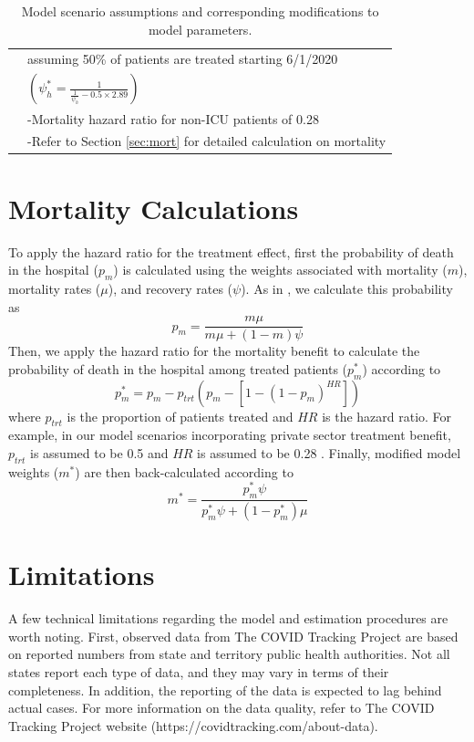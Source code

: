 \documentclass{article}
\begin{document}
\begin{table}
\begin{center}
\begin{tabular}{|c|l|}
 & assuming 50\% of patients are treated starting 6/1/2020 \\
 & $\left(\psi_h^* = \frac{1}{\frac{1}{\psi_h} - 0.5\times2.89}\right)$ \\
 & -Mortality hazard ratio for non-ICU patients of 0.28 \\
 & -Refer to Section \ref{sec:mort} for detailed calculation on mortality \\
\hline
\end{tabular}
\caption{Model scenario assumptions and corresponding modifications to model parameters.}
\label{tab:eff}
\end{center}
\end{table}

\clearpage

\section{Mortality Calculations \label{sec:mort}}

To apply the hazard ratio for the treatment effect, first the probability of death in the hospital ($p_m$) is calculated using the weights associated with mortality ($m$), mortality rates ($\mu$), and recovery rates ($\psi$). As in \citet{moghadasCOVID}, we calculate this probability as
\[p_m = \frac{m\mu}{m\mu + (1-m)\psi}\]
Then, we apply the hazard ratio for the mortality benefit to calculate the probability of death in the hospital among treated patients ($p_m^*$) according to
\[p_m^* = p_m - p_{trt}\left(p_m - \left[1 - (1 - p_m)^{HR}\right]\right)\]
where $p_{trt}$ is the proportion of patients treated and $HR$ is the hazard ratio. For example, in our model scenarios incorporating private sector treatment benefit, $p_{trt}$ is assumed to be 0.5 and $HR$ is assumed to be 0.28 \citep{Beigel:2020}. Finally, modified model weights ($m^*$) are then back-calculated according to
\[m^* = \frac{p_m^*\psi}{p_m^*\psi + (1 - p_m^*)\mu}\]

\section{Limitations \label{sec:lim}}

A few technical limitations regarding the model and estimation procedures are worth noting. First, observed data from The COVID Tracking Project are based on reported numbers from state and territory public health authorities. Not all states report each type of data, and they may vary in terms of their completeness. In addition, the reporting of the data is expected to lag behind actual cases. For more information on the data quality, refer to The COVID Tracking Project website (https://covidtracking.com/about-data).
\end{document}
